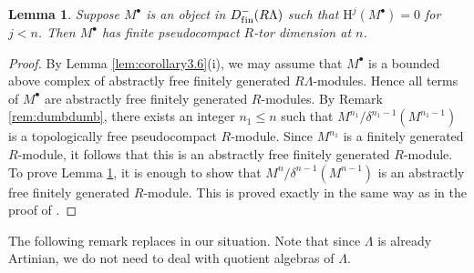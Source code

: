 \documentclass{amsart}
\theoremstyle{plain}
\newtheorem{lemma}[thm]{Lemma}
\theoremstyle{definition}
\theoremstyle{remark}
\begin{document}
\begin{lemma}
\label{lem:lemma3.8}
Suppose $M^\bullet$ is an object in $D^{-}_{\mathrm{f\/in}}(R\Lambda)$ such that ${\mathrm{H}}^j(M^\bullet)=0$
for $j<n$. Then $M^\bullet$ has finite pseudocompact $R$-tor dimension at $n$.
\end{lemma}

\begin{proof}
By Lemma \ref{lem:corollary3.6}(i), we may assume that $M^\bullet$ is a bounded above
complex of abstractly free finitely generated $R\Lambda$-modules. Hence all terms
of $M^\bullet$ are abstractly free finitely generated $R$-modules.
By Remark \ref{rem:dumbdumb}, there exists an integer $n_1\leq n$ such that $M^{n_1}/
\delta^{n_1-1}(M^{n_1-1})$ is a topologically free pseudocompact  $R$-module. Since $M^{n_1}$
is a finitely generated $R$-module, it follows that this is an abstractly free finitely generated $R$-module. 
To prove Lemma \ref{lem:lemma3.8}, it is enough to show that  $M^{n}/\delta^{n-1}(M^{n-1})$ is an 
abstractly free finitely generated $R$-module. 
This is proved exactly in the same way as in the proof of 
\cite[Lemma 3.8]{bcderived}.
\end{proof}

The following remark replaces  \cite[Cors. 3.10 and 3.11]{bcderived} in our situation. Note that since
$\Lambda$ is already Artinian, we do not need to deal with quotient algebras of $\Lambda$.
\end{document}
